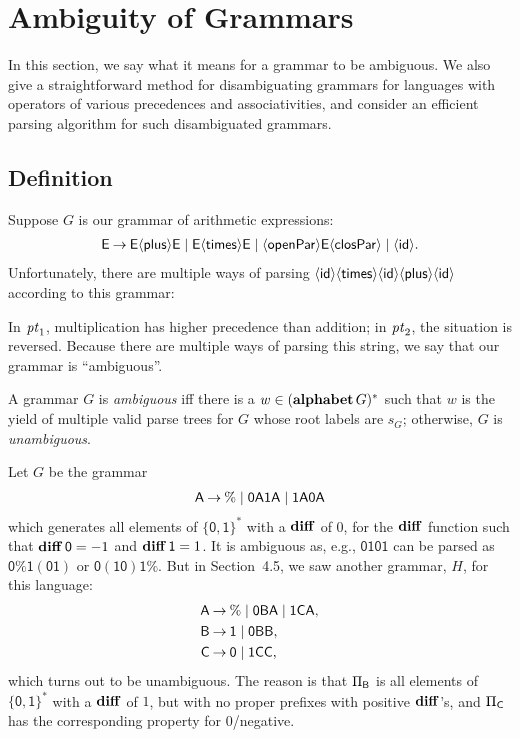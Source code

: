 \section{Ambiguity of Grammars}
\label{AmbiguityOfGrammars}

In this section, we say what it means for a grammar to be ambiguous.
We also give a straightforward method for disambiguating
grammars for languages with operators of various precedences and
associativities, and consider an efficient parsing algorithm for
such disambiguated grammars.

\subsection{Definition}

Suppose $G$ is our grammar of arithmetic expressions:
\begin{gather*}
\mathsf{E\mathbin{\to} E{\langle\mathsf{plus}\rangle} E\mid E{\langle\mathsf{times}\rangle} E\mid {\langle\mathsf{openPar}\rangle} E{\langle\mathsf{closPar}\rangle} \mid
{\langle\mathsf{id}\rangle}} .
\end{gather*}
Unfortunately,
there are multiple ways of parsing
${\langle\mathsf{id}\rangle}{\langle\mathsf{times}\rangle}{\langle\mathsf{id}\rangle}{\langle\mathsf{plus}\rangle}{\langle\mathsf{id}\rangle}$ according to this grammar:
\begin{center}

\end{center}
In ${\it pt}_1$, multiplication has higher precedence than addition; in
${\it pt}_2$, the situation is reversed.  Because there are multiple ways
of parsing this string, we say that our grammar is ``ambiguous''.

A grammar $G$ is \emph{ambiguous} iff there is a
$w\in(\mathbf{alphabet}\,G)^*$ such that $w$ is the yield of multiple valid
parse trees for $G$ whose root labels are $s_G$; otherwise, $G$ is
\emph{unambiguous}.

Let $G$ be the grammar
\begin{gather*}
\mathsf{A} \mathbin{\to} \% \mid \mathsf{0A1A} \mid \mathsf{1A0A}
\end{gather*}
which generates all elements
of $\{\mathsf{0,1}\}^*$ with a $\mathbf{diff}$ of $0$, for the $\mathbf{diff}$
function such that $\mathbf{diff}\,\mathsf{0} = -1$ and $\mathbf{diff}\,\mathsf{1} = 1$.
It is ambiguous as, e.g., $\mathsf{0101}$ can be parsed as
$\mathsf{0\%1(01)}$ or $\mathsf{0(10)1\%}$.
But in Section~4.5, we saw another grammar, $H$, for this
language:
\begin{align*}
\mathsf{A} &\mathbin{\to} \% \mid \mathsf{0}\mathsf{B}\mathsf{A} \mid \mathsf{1}\mathsf{C}\mathsf{A} , \\
\mathsf{B} &\mathbin{\to} \mathsf{1} \mid \mathsf{0}\mathsf{B}\mathsf{B} , \\
\mathsf{C} &\mathbin{\to} \mathsf{0} \mid \mathsf{1}\mathsf{C}\mathsf{C} ,
\end{align*}
which turns out to be unambiguous.
The reason is that $\Pi_{\mathsf{B}}$ is all elements of $\{\mathsf{0,1}\}^*$
with a $\mathbf{diff}$ of $1$, but with no proper prefixes with positive
$\mathbf{diff}$'s, and $\Pi_{\mathsf{C}}$ has the corresponding property for
$0$/negative.

